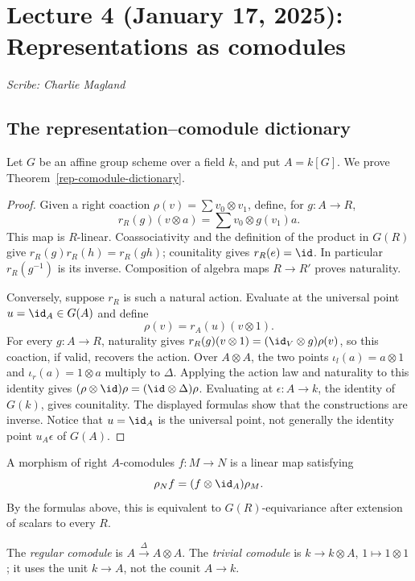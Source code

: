 \section{Lecture 4 (January 17, 2025): Representations as comodules}\label{lec4}
\noindent\textit{Scribe: Charlie Magland}

\subsection{The representation--comodule dictionary}
Let $G$ be an affine group scheme over a field $k$, and put $A=k[G]$.
We prove Theorem~\ref{rep-comodule-dictionary}.

\begin{proof}
Given a right coaction $\rho(v)=\sum v_0\otimes v_1$, define, for
$g:A\to R$,
\[
 r_R(g)(v\otimes a)=\sum v_0\otimes g(v_1)a.
\]
This map is $R$-linear. Coassociativity and the definition of the product
in $G(R)$ give $r_R(g)r_R(h)=r_R(gh)$; counitality gives
$r_R(e)=\id$. In particular $r_R(g^{-1})$ is its inverse. Composition
of algebra maps $R\to R'$ proves naturality.

Conversely, suppose $r_R$ is such a natural action. Evaluate at the
universal point $u=\id_A\in G(A)$ and define
\[
 \rho(v)=r_A(u)(v\otimes1).
\]
For every $g:A\to R$, naturality gives
$r_R(g)(v\otimes1)=(\id_V\otimes g)\rho(v)$, so this coaction, if
valid, recovers the action. Over $A\otimes A$, the two points
$\iota_l(a)=a\otimes1$ and $\iota_r(a)=1\otimes a$ multiply to
$\Delta$. Applying the action law and naturality to this identity gives
$(\rho\otimes\id)\rho=(\id\otimes\Delta)\rho$. Evaluating at
$\epsilon:A\to k$, the identity of $G(k)$, gives counitality.
The displayed formulas show that the constructions are inverse.
Notice that $u=\id_A$ is the universal point, not generally the identity
point $u_A\epsilon$ of $G(A)$.
\end{proof}

\begin{definition}
A morphism of right $A$-comodules $f:M\to N$ is a linear map satisfying
\[
 \rho_Nf=(f\otimes\id_A)\rho_M.
\]
By the formulas above, this is equivalent to $G(R)$-equivariance after
extension of scalars to every $R$.
\end{definition}

\begin{example}
The \emph{regular comodule} is $A\xrightarrow{\Delta}A\otimes A$.
The \emph{trivial comodule} is $k\to k\otimes A$, $1\mapsto1\otimes1$;
it uses the unit $k\to A$, not the counit $A\to k$.
\end{example}

